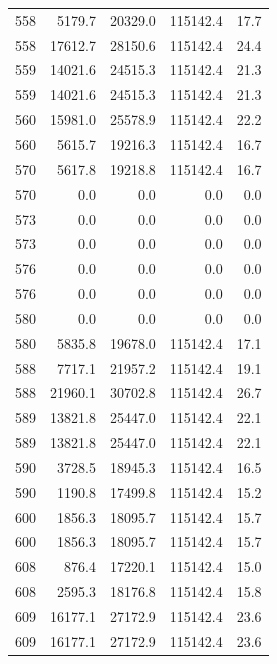 \begin{longtable}{rrrrr}
    558 & \num{5179.7} & \num{20329.0} & \num{115142.4} & 17.7 \\
    558 & \num{17612.7} & \num{28150.6} & \num{115142.4} & 24.4 \\
    559 & \num{14021.6} & \num{24515.3} & \num{115142.4} & 21.3 \\
    559 & \num{14021.6} & \num{24515.3} & \num{115142.4} & 21.3 \\
    560 & \num{15981.0} & \num{25578.9} & \num{115142.4} & 22.2 \\
    560 & \num{5615.7} & \num{19216.3} & \num{115142.4} & 16.7 \\
    570 & \num{5617.8} & \num{19218.8} & \num{115142.4} & 16.7 \\
    570 & \num{0.0} & \num{0.0} & \num{0.0} & 0.0 \\
    573 & \num{0.0} & \num{0.0} & \num{0.0} & 0.0 \\
    573 & \num{0.0} & \num{0.0} & \num{0.0} & 0.0 \\
    576 & \num{0.0} & \num{0.0} & \num{0.0} & 0.0 \\
    576 & \num{0.0} & \num{0.0} & \num{0.0} & 0.0 \\
    580 & \num{0.0} & \num{0.0} & \num{0.0} & 0.0 \\
    580 & \num{5835.8} & \num{19678.0} & \num{115142.4} & 17.1 \\
    588 & \num{7717.1} & \num{21957.2} & \num{115142.4} & 19.1 \\
    588 & \num{21960.1} & \num{30702.8} & \num{115142.4} & 26.7 \\
    589 & \num{13821.8} & \num{25447.0} & \num{115142.4} & 22.1 \\
    589 & \num{13821.8} & \num{25447.0} & \num{115142.4} & 22.1 \\
    590 & \num{3728.5} & \num{18945.3} & \num{115142.4} & 16.5 \\
    590 & \num{1190.8} & \num{17499.8} & \num{115142.4} & 15.2 \\
    600 & \num{1856.3} & \num{18095.7} & \num{115142.4} & 15.7 \\
    600 & \num{1856.3} & \num{18095.7} & \num{115142.4} & 15.7 \\
    608 & \num{876.4} & \num{17220.1} & \num{115142.4} & 15.0 \\
    608 & \num{2595.3} & \num{18176.8} & \num{115142.4} & 15.8 \\
    609 & \num{16177.1} & \num{27172.9} & \num{115142.4} & 23.6 \\
    609 & \num{16177.1} & \num{27172.9} & \num{115142.4} & 23.6 \\

\end{longtable}
